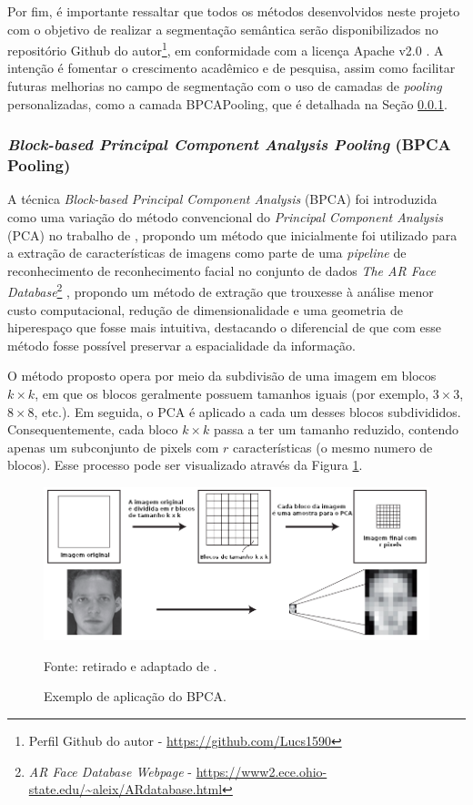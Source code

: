 Por fim, é importante ressaltar que todos os métodos desenvolvidos neste projeto com o objetivo de realizar a segmentação semântica serão disponibilizados no repositório Github do autor\footnote{Perfil Github do autor - \url{https://github.com/Lucs1590}}, em conformidade com a licença Apache v2.0 \citep{Licenses}. A intenção é fomentar o crescimento acadêmico e de pesquisa, assim como facilitar futuras melhorias no campo de segmentação com o uso de camadas de \textit{pooling} personalizadas, como a camada BPCAPooling, que é detalhada na Seção \ref{project:bpca}.


\subsubsection{\textit{Block-based Principal Component Analysis Pooling} (BPCA Pooling)}
\label{project:bpca}
A técnica \textit{Block-based Principal Component Analysis} (BPCA) foi introduzida como uma variação do método convencional do \textit{Principal Component Analysis} (PCA) no trabalho de \cite{Salvadeo2011}, propondo um método que inicialmente foi utilizado para a extração de características de imagens como parte de uma \textit{pipeline} de reconhecimento de reconhecimento facial no conjunto de dados \textit{The AR Face Database}\footnote{\textit{AR Face Database Webpage} - \url{https://www2.ece.ohio-state.edu/~aleix/ARdatabase.html}} \citep{MartNez1998TheDatabase} , propondo um método de extração que trouxesse à análise menor custo computacional, redução de dimensionalidade e uma geometria de hiperespaço que fosse mais intuitiva, destacando o diferencial de que com esse método fosse possível preservar a espacialidade da informação.

O método proposto opera por meio da subdivisão de uma imagem em blocos $k \times k$, em que os blocos geralmente possuem tamanhos iguais (por exemplo, $3 \times 3$, $8 \times 8$, etc.). Em seguida, o PCA é aplicado a cada um desses blocos subdivididos. Consequentemente, cada bloco $k \times k$ passa a ter um tamanho reduzido, contendo apenas um subconjunto de pixels com $r$ características (o mesmo numero de blocos). Esse processo pode ser visualizado através da Figura \ref{project:fig:bpca_1}.

\begin{figure}[H]
    \centering
    \caption{Exemplo de aplicação do BPCA.}
    \label{project:fig:bpca_1}
    \includegraphics[width=1\textwidth]{recursos/imagens/project/BPCA.png}

    Fonte: retirado e adaptado de \cite{Salvadeo2011}.
\end{figure}

